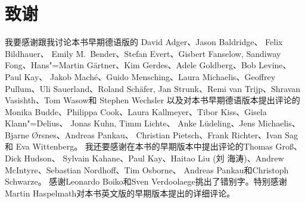 \section*{致谢}

我要感谢跟我讨论本书早期德语版的
David Adger、Jason Baldridge、 Felix Bildhauer、
Emily M.\ Bender、Stefan Evert、Gisbert Fanselow, 
Sandiway Fong、Hans"=Martin Gärtner、Kim Gerdes、Adele Goldberg、Bob Levine、Paul Kay、
Jakob Maché、Guido Mensching、Laura Michaelis、Geoffrey Pullum、Uli Sauerland、Roland Schäfer,
Jan Strunk、Remi van Trijp、Shravan Vasishth、Tom Wasow和
Stephen Wechsler
%
以及对本书早期德语版本提出评论的
Monika Budde、Philippa Cook、Laura Kallmeyer、Tibor Kiss、Gisela Klann"=Delius、 Jonas Kuhn,
Timm Lichte、%
Anke Lüdeling、Jens Michaelis、Bjarne Ørsnes、Andreas Pankau、    %
Christian Pietsch、Frank Richter、Ivan Sag
和
Eva Wittenberg。
%
%
我还要感谢在本书的早期版本中提出评论的Thomas Groß、Dick Hudson、
Sylvain Kahane、Paul Kay、Haitao Liu (刘 海涛)、Andrew McIntyre、Sebastian Nordhoff、Tim Osborne、
Andreas Pankau和Christoph Schwarze。
感谢Leonardo Boiko和Sven Verdoolaege挑出了错别字。特别感谢Martin Haspelmath对本书英文版的早期版本提出的详细评论。

